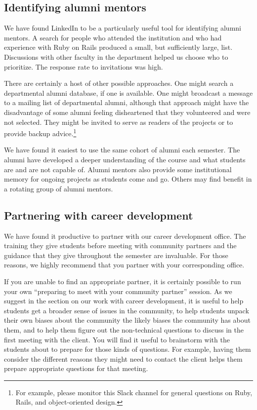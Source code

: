\subsection{Identifying alumni mentors}

We have found LinkedIn to be a particularly useful tool for identifying
alumni mentors.  A search for people who attended the institution and
who had experience with Ruby on Rails produced a small, but sufficiently
large, list.  Discussions with other faculty in the department helped
us choose who to prioritize.  The response rate to invitations was high.

There are certainly a host of other possible approaches.  One might search
a departmental alumni database, if one is available.  One might broadcast
a message to a mailing list of departmental alumni, although that approach
might have the disadvantage of some alumni feeling disheartened that they
volunteered and were not selected.  They might be invited to serve as
readers of the projects or to provide backup advice.\footnote{For example,
please monitor this Slack channel for general questions on Ruby, Rails,
and object-oriented design.} %

We have found it easiest to use the same cohort of alumni each semester.
The alumni have developed a deeper understanding of the course and what
students are and are not capable of.  Alumni mentors also provide some 
institutional memory for ongoing projects as students come and go. 
Others may find benefit in a rotating group of alumni mentors.

\subsection{Partnering with career development}

We have found it productive to partner with our career development
office.  The training they give students before meeting with community
partners and the guidance that they give throughout the semester
are invaluable.  For those reasons, we highly recommend that you
partner with your corresponding office.

If you are unable to find an appropriate partner, it is certainly
possible to run your own ``preparing to meet with your community
partner'' session.  As we suggest in the section on our work with
career development, it is useful to help students get a broader
sense of issues in the community, to help students
unpack their own biases about the community the
likely biases the community has about them, and to
help them figure out the non-technical questions to discuss in the
first meeting with the client.  You will find it useful to brainstorm
with the students about to prepare for those kinds of questions.
For example, having them consider the different reasons they might
need to contact the client helps them prepare appropriate questions
for that meeting.


